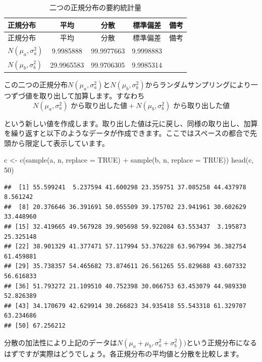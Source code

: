 \documentclass[a4paper]{tufte-handout}
\newenvironment{Shaded}{}{}
\newcommand{\AttributeTok}[1]{\textcolor[rgb]{0.49,0.56,0.16}{#1}}
\newcommand{\ConstantTok}[1]{\textcolor[rgb]{0.53,0.00,0.00}{#1}}
\newcommand{\DecValTok}[1]{\textcolor[rgb]{0.25,0.63,0.44}{#1}}
\newcommand{\FunctionTok}[1]{\textcolor[rgb]{0.02,0.16,0.49}{#1}}
\newcommand{\NormalTok}[1]{#1}
\newcommand{\OtherTok}[1]{\textcolor[rgb]{0.00,0.44,0.13}{#1}}
\newcommand{\SpecialCharTok}[1]{\textcolor[rgb]{0.25,0.44,0.63}{#1}}
\begin{document}
\begin{longtable}[]{@{}lcccl@{}}
\caption{二つの正規分布の要約統計量}\tabularnewline
\toprule
正規分布 & 平均 & 分散 & 標準偏差 & 備考 \\
\midrule
\endfirsthead
\toprule
正規分布 & 平均 & 分散 & 標準偏差 & 備考 \\
\midrule
\endhead
\(N(\mu_a, \sigma^2_a)\) & 9.9985888 & 99.9977663 & 9.9998883 & \\
\(N(\mu_b, \sigma^2_b)\) & 29.9965583 & 99.9706305 & 9.9985314 & \\
\bottomrule
\end{longtable}

この二つの正規分布\(N(\mu_a, \sigma^2_a)\)と\(N(\mu_b,\sigma^2_b)\)からランダムサンプリングにより一つずづ値を取り出して加算します。すなわち
　
\[N(\mu_a, \sigma^2_a)\mbox{ から取り出した値} + N(\mu_b,\sigma^2_b)\mbox{ から取り出した値}\]

という新しい値を作成します。取り出した値は元に戻し、同様の取り出し、加算を繰り返すと以下のようなデータが作成できます。ここではスペースの都合で先頭から限定して表示しています。

\begin{Shaded}
\begin{Highlighting}[numbers=left,,]
\NormalTok{c }\OtherTok{\textless{}{-}} \FunctionTok{c}\NormalTok{(}\FunctionTok{sample}\NormalTok{(a, n, }\AttributeTok{replace =} \ConstantTok{TRUE}\NormalTok{) }\SpecialCharTok{+} \FunctionTok{sample}\NormalTok{(b, n, }\AttributeTok{replace =} \ConstantTok{TRUE}\NormalTok{))}
\FunctionTok{head}\NormalTok{(c, }\DecValTok{50}\NormalTok{)}
\end{Highlighting}
\end{Shaded}

\begin{verbatim}
##  [1] 55.599241  5.237594 41.600298 23.359751 37.085258 44.437978  8.561242
##  [8] 20.376646 36.391691 50.055509 39.175702 23.941961 30.602629 33.448960
## [15] 32.419665 49.567928 39.905698 59.922084 63.553437  3.195873 25.325148
## [22] 38.901329 41.377471 57.117994 53.376228 63.967994 36.382754 61.459881
## [29] 35.738357 54.465682 73.874611 26.561265 55.829688 43.607332 56.616833
## [36] 51.793272 21.109510 40.752398 30.066753 63.453079 44.989330 52.826389
## [43] 34.170679 42.629914 30.266823 34.935418 55.543318 61.329707 63.234686
## [50] 67.256212
\end{verbatim}

分散の加法性により上記のデータは\(N(\mu_a + \mu_b, \sigma^2_a + \sigma^2_b))\)という正規分布になるはずですが実際はどうでしょう。各正規分布の平均値と分散を比較します。
\end{document}

